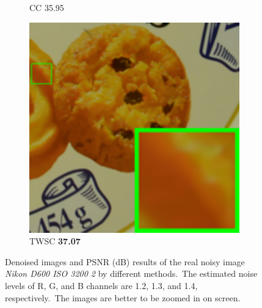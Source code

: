 \begin{figure}
\begin{subfigure}[t]{0.19\textwidth}
		\caption{CC 35.95}
    \end{subfigure}
    \hfill
    \begin{subfigure}[t]{0.19\textwidth}
        \centering
        \includegraphics[width=1\textwidth]{images/twsc/cc/resize_br_TWSC_d600_iso3200_2.png}
		\caption{TWSC \textbf{37.07}}
    \end{subfigure}
    \caption{Denoised images and PSNR (dB) results of the real noisy image \textsl{Nikon D600 ISO 3200 2} \cite{crosschannel2016} by different methods.\ The estimated noise levels of R, G, and B channels are 1.2, 1.3, and 1.4, respectively.\ The images are better to be zoomed in on screen.}
    \label{fig5-12}
\end{figure}


